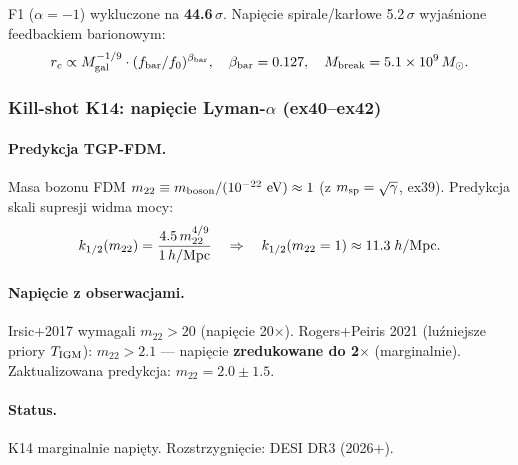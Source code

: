 F1 ($\alpha=-1$) wykluczone na \textbf{44.6\,$\sigma$}.
Napięcie spirale/karłowe 5.2\,$\sigma$ wyjaśnione feedbackiem barionowym:
\begin{equation}
  r_c \propto M_{\rm gal}^{-1/9}\cdot (f_{\rm bar}/f_0)^{\beta_{\rm bar}},
  \quad \beta_{\rm bar} = 0.127, \quad M_{\rm break} = 5.1\times10^9\,M_\odot.
\end{equation}

\subsubsection{Kill-shot K14: napięcie Lyman-$\alpha$ (ex40--ex42)}

\paragraph{Predykcja TGP-FDM.}
Masa bozonu FDM $m_{22} \equiv m_{\rm boson}/(10^{-22}~{\rm eV}) \approx 1$
(z $m_{\rm sp} = \sqrt{\gamma}$, ex39). Predykcja skali supresji widma mocy:
\begin{equation}
  k_{1/2}(m_{22}) = \frac{4.5\,m_{22}^{4/9}}{1\,h/{\rm Mpc}}
  \quad\Rightarrow\quad k_{1/2}(m_{22}=1) \approx 11.3\;h/{\rm Mpc}.
\end{equation}

\paragraph{Napięcie z obserwacjami.}
Irsic+2017 wymagali $m_{22} > 20$ (napięcie 20$\times$).
Rogers+Peiris 2021 (luźniejsze priory $T_{\rm IGM}$): $m_{22} > 2.1$ ---
napięcie \textbf{zredukowane do 2$\times$} (marginalnie).
Zaktualizowana predykcja: $m_{22} = 2.0 \pm 1.5$.

\paragraph{Status.} K14 marginalnie napięty. Rozstrzygnięcie: DESI DR3 (2026+).

